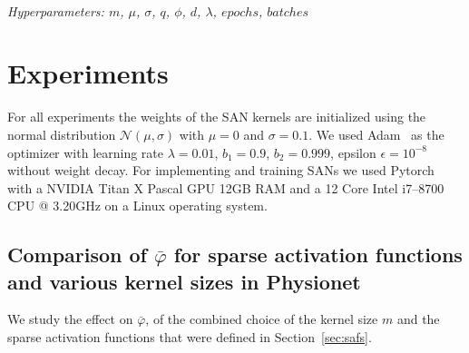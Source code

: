 \documentclass[journal]{IEEEtran}
\begin{document}
\begin{algorithm}[H]
  \caption{Sparsely Activated Networks training}\label{alg:training}
  \begin{algorithmic}[1]
    \renewcommand{\algorithmicrequire}{\textbf{Input:}}
    \renewcommand{\algorithmicensure}{\textbf{Output:}}
    \\ \textit{Hyperparameters:  $m$, $\mu$, $\sigma$, $q$, $\phi$,
    $d$, $\lambda$, $epochs$, $batches$}
    \ENDFOR{}
    \ENDFOR{}
    \ENDFOR{}
    \ENDFOR{}
  \end{algorithmic}
\end{algorithm}
\section{Experiments}\label{sec:experiments}
For all experiments the weights of the SAN kernels are initialized
using the normal distribution $\mathcal{N}(\mu, \sigma)$ with $\mu=0$
and $\sigma=0.1$.
We used Adam~\cite{kingma2014adam} as the optimizer with learning
rate $\lambda=0.01$, $b_1=0.9$, $b_2=0.999$, epsilon
$\epsilon=10^{-8}$ without weight decay.
For implementing and training SANs we used
Pytorch~\cite{paszke2017automatic} with a NVIDIA Titan X Pascal GPU
12GB RAM and a 12 Core Intel i7--8700 CPU @ 3.20GHz on a Linux operating system.
\subsection{Comparison of $\bar\varphi$ for sparse activation
functions and various kernel sizes in Physionet}
We study the effect on $\bar\varphi$, of the combined choice of the
kernel size $m$ and the sparse activation functions that were defined
in Section~\ref{sec:safs}.
\end{document}
